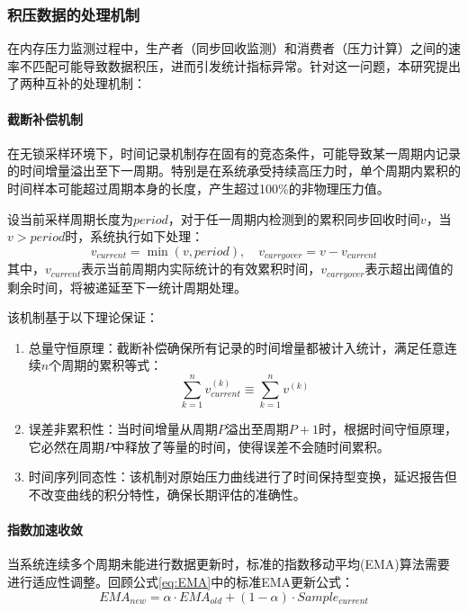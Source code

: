 \subsubsection{积压数据的处理机制}

在内存压力监测过程中，生产者（同步回收监测）和消费者（压力计算）之间的速率不匹配可能导致数据积压，进而引发统计指标异常。针对这一问题，本研究提出了两种互补的处理机制：

\paragraph{截断补偿机制} \quad 在无锁采样环境下，时间记录机制存在固有的竞态条件，可能导致某一周期内记录的时间增量溢出至下一周期。特别是在系统承受持续高压力时，单个周期内累积的时间样本可能超过周期本身的长度，产生超过100\%的非物理压力值。

设当前采样周期长度为\(period\)，对于任一周期内检测到的累积同步回收时间\(v\)，当\(v > \textit{period}\)时，系统执行如下处理：
\begin{equation}
v_{current} = \min(v, \textit{period}), \quad v_{carryover} = v - v_{current}
\end{equation}
其中，\(v_{current}\)表示当前周期内实际统计的有效累积时间，\(v_{carryover}\)表示超出阈值的剩余时间，将被递延至下一统计周期处理。

该机制基于以下理论保证：
\begin{enumerate}
    \item 总量守恒原理：截断补偿确保所有记录的时间增量都被计入统计，满足任意连续\(n\)个周期的累积等式：
    \begin{equation}
        \sum_{k=1}^n v_{current}^{(k)} \equiv \sum_{k=1}^n v^{(k)}
    \end{equation}
    \item 误差非累积性：当时间增量从周期\(P\)溢出至周期\(P+1\)时，根据时间守恒原理，它必然在周期\(P\)中释放了等量的时间，使得误差不会随时间累积。
    \item 时间序列同态性：该机制对原始压力曲线进行了时间保持型变换，延迟报告但不改变曲线的积分特性，确保长期评估的准确性。
\end{enumerate}

\paragraph{指数加速收敛} \quad 当系统连续多个周期未能进行数据更新时，标准的指数移动平均(EMA)算法需要进行适应性调整。回顾公式\ref{eq:EMA}中的标准EMA更新公式：
\begin{equation}
    EMA_{new} = \alpha \cdot EMA_{old} + (1-\alpha) \cdot Sample_{current}
\end{equation}

